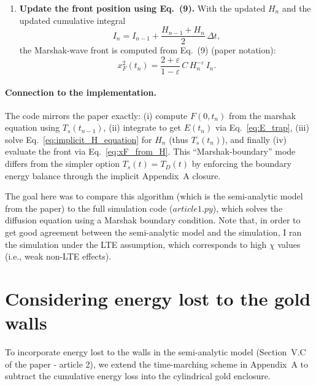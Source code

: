 \documentclass{article}
\begin{document}
\begin{enumerate}
    \item \textbf{Update the front position using Eq.~(9).}
    With the updated $H_n$ and the updated cumulative integral
    \begin{equation}
    I_n = I_{n-1} + \frac{H_{n-1}+H_n}{2}\,\Delta t,
    \end{equation}
    the Marshak-wave front is computed from Eq.~(9) (paper notation):
    \begin{equation}
    x_F^2(t_n)
    =
    \frac{2+\varepsilon}{1-\varepsilon}\,C\,H_n^{-\varepsilon}\,I_n.
    \label{eq:xF_from_H}
    \end{equation}
\end{enumerate}

\paragraph{Connection to the implementation.}
The code mirrors the paper exactly:
(i) compute $F(0,t_n)$ from the marshak equation using $T_s(t_{n-1})$,
(ii) integrate to get $E(t_n)$ via Eq.~\eqref{eq:E_trap},
(iii) solve Eq.~\eqref{eq:implicit_H_equation} for $H_n$ (thus $T_s(t_n)$),
and finally (iv) evaluate the front via Eq.~\eqref{eq:xF_from_H}.
This ``Marshak-boundary'' mode differs from the simpler option $T_s(t)=T_D(t)$ by enforcing the boundary energy balance through the implicit Appendix~A closure.

The goal here was to compare this algorithm (which is the semi-analytic model from the paper) to the full simulation code ($article1.py$), which solves the diffusion equation using a Marshak boundary condition. Note that, in order to get good agreement between the semi-analytic model and the simulation, I ran the simulation under the LTE assumption, which corresponds to high $\chi$ values (i.e., weak non-LTE effects).

\section{Considering energy lost to the gold walls}
To incorporate energy lost to the walls in the semi-analytic model (Section~V.C of the paper - article 2), we extend the time-marching scheme in Appendix~A to subtract the cumulative energy loss into the cylindrical gold enclosure.
\end{document}
